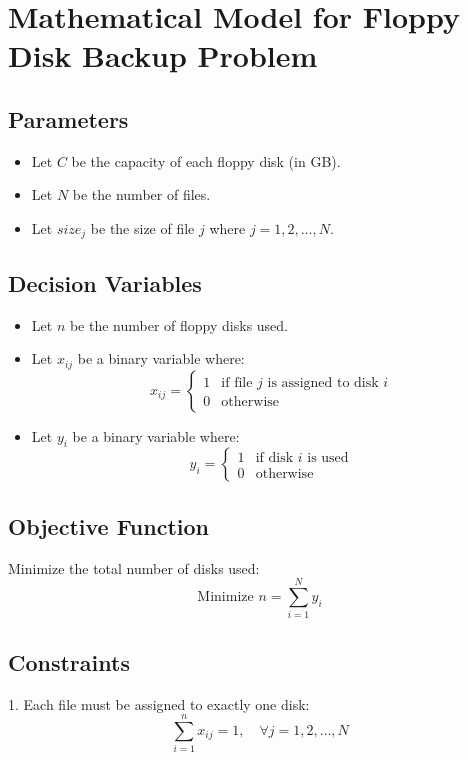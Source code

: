 \documentclass{article}
\begin{document}
\section*{Mathematical Model for Floppy Disk Backup Problem}

\subsection*{Parameters}
\begin{itemize}
    \item Let \( C \) be the capacity of each floppy disk (in GB).
    \item Let \( N \) be the number of files.
    \item Let \( size_j \) be the size of file \( j \) where \( j = 1, 2, \ldots, N \).
\end{itemize}

\subsection*{Decision Variables}
\begin{itemize}
    \item Let \( n \) be the number of floppy disks used.
    \item Let \( x_{ij} \) be a binary variable where:
        \[
        x_{ij} = 
        \begin{cases} 
        1 & \text{if file } j \text{ is assigned to disk } i \\
        0 & \text{otherwise} 
        \end{cases}
        \]
    \item Let \( y_i \) be a binary variable where:
        \[
        y_i = 
        \begin{cases} 
        1 & \text{if disk } i \text{ is used} \\
        0 & \text{otherwise} 
        \end{cases}
        \]
\end{itemize}

\subsection*{Objective Function}
Minimize the total number of disks used:
\[
\text{Minimize } n = \sum_{i=1}^{N} y_i
\]

\subsection*{Constraints}
1. Each file must be assigned to exactly one disk:
   \[
   \sum_{i=1}^{n} x_{ij} = 1, \quad \forall j = 1, 2, \ldots, N
   \]
   
\end{document}
